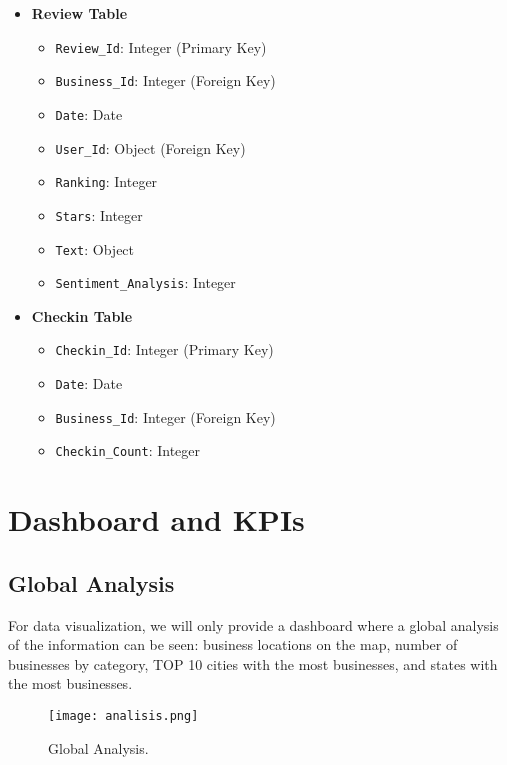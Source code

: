 \documentclass[12pt]{article}
\begin{document}
\begin{itemize}
    \item \textbf{Review Table}
    \begin{itemize}
        \item \texttt{Review\_Id}: Integer (Primary Key)
        \item \texttt{Business\_Id}: Integer (Foreign Key)
        \item \texttt{Date}: Date
        \item \texttt{User\_Id}: Object (Foreign Key)
        \item \texttt{Ranking}: Integer
        \item \texttt{Stars}: Integer
        \item \texttt{Text}: Object
        \item \texttt{Sentiment\_Analysis}: Integer
    \end{itemize}

    \item \textbf{Checkin Table}
    \begin{itemize}
        \item \texttt{Checkin\_Id}: Integer (Primary Key)
        \item \texttt{Date}: Date
        \item \texttt{Business\_Id}: Integer (Foreign Key)
        \item \texttt{Checkin\_Count}: Integer
    \end{itemize}
\end{itemize}

\section{Dashboard and KPIs}

\subsection{Global Analysis}

For data visualization, we will only provide a dashboard where a global analysis of the information can be seen: business locations on the map, number of businesses by category, TOP 10 cities with the most businesses, and states with the most businesses.

\begin{figure}[H]
  \centering
  \texttt{[image: analisis.png]}
  \caption{Global Analysis.}
  \label{fig: Global Analysis}
\end{figure}
\end{document}
